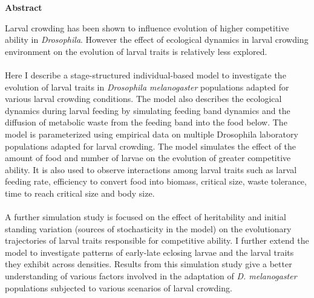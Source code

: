 
\begin{center}
\Large  {\bf Abstract }
\end{center}
Larval crowding has been shown to influence evolution of higher competitive ability in \textit{Drosophila}. However the effect of ecological dynamics in larval crowding environment on the evolution of larval traits is relatively less explored.\\\\
Here I describe a stage-structured individual-based model to investigate the evolution of larval traits in \textit{Drosophila melanogaster} populations adapted for various larval crowding conditions. The model also describes the ecological dynamics during larval feeding by simulating feeding band dynamics and the diffusion of metabolic waste from the feeding band into the food below. The model is parameterized using empirical data on multiple Drosophila laboratory populations adapted for larval crowding. The model simulates the effect of the amount of food and number of larvae on the evolution of greater competitive ability. It is also used to observe interactions among larval traits such as larval feeding rate, efficiency to convert food into biomass, critical size, waste tolerance, time to reach critical size and body size.\\\\
A further simulation study is focused on the effect of heritability and initial standing variation (sources of stochasticity in the model) on the evolutionary trajectories of larval traits responsible for competitive ability. I further extend the model to investigate patterns of early-late eclosing larvae and the larval traits they exhibit across densities. Results from this simulation study give a better understanding of various factors involved in the adaptation of \textit{D. melanogaster} populations subjected to various scenarios of larval crowding.
\vfill
\cleardoublepage
